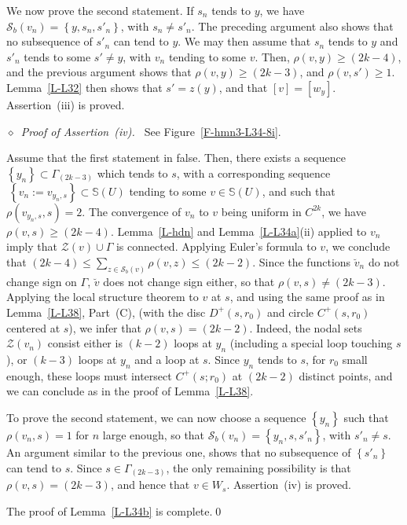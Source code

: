 \documentclass[12pt,a4paper]{amsart}
\theoremstyle{plain} %
\theoremstyle{definition}
\numberwithin{equation}{section}
\numberwithin{figure}{section}
\numberwithin{table}{section}
\newcommand{\bS}{\mathbb{S}}
\newcommand{\cS}{\mathcal{S}}
\newcommand{\cZ}{\mathcal{Z}}
\newcommand{\set}[1]{\left\lbrace #1 \right\rbrace}
\newcommand{\noi}{\noindent}
\newcommand{\noid}{\noindent $\diamond$~}
\begin{document}
We now prove the second statement. If $s_n$ tends to $y$, we have $\cS_b(v_n) = \set{y,s_n,s'_n}$, with $s_n \neq s'_n$. The preceding argument also shows that no subsequence of $s'_n$ can tend to $y$. We may then assume that $s_n$ tends to $y$ and $s'_n$ tends to some $s' \neq y$, with $v_n$ tending to some $v$. Then, $\rho(v,y) \ge (2k-4)$, and the previous argument shows that $\rho(v,y) \ge (2k-3)$, and $\rho(v,s') \ge 1$. Lemma~\ref{L-L32} then shows that $s' = z(y)$, and that $[v]=[w_y]$. Assertion~(iii) is proved. \medskip

\noid \emph{Proof of  Assertion~(iv).~} See Figure~\ref{F-hmn3-L34-8i}.\smallskip

\noi Assume that the first statement in false. Then, there exists a sequence $\set{y_n} \subset \Gamma_{(2k -3)}$ which tends to $s$, with a corresponding sequence $\ \set{v_n:=v_{y_n,s}} \subset \bS(U)$ tending to some $v \in \bS(U)$, and such that $\rho(v_{y_n,s},s) = 2$. The convergence of $v_n$ to $v$ being uniform in $C^{2k}$, we have $\rho(v,s) \ge (2k-4)$. Lemma~\ref{L-hdn} and Lemma~\ref{L-L34a}(ii) applied to $v_n$  imply that $ \cZ(v) \cup \Gamma $ is connected.  Applying Euler's formula to $v$, we conclude that $(2k-4) \le \sum_{z \in \cS_b(v)} \rho(v,z) \le (2k-2)$. Since the functions $\breve{v}_n$ do not change sign on $\Gamma $, $\breve{v}$ does not change sign either, so that $\rho(v,s) \neq (2k-3)$. Applying the local structure theorem to $v$ at $s$, and using the same proof as in Lemma~\ref{L-L38},  Part~(C),  (with the disc $D^{+}(s,r_0)$ and circle $C^{+}(s,r_0)$ centered at $s$), we infer that $\rho(v,s) = (2k-2)$.   Indeed, the nodal sets $\cZ(v_n)$ consist either is $(k-2)$ loops at $y_n$ (including a special loop touching $s$), or $(k-3)$ loops at $y_n$ and a loop at $s$. Since $y_n$ tends to $s$, for $r_0$ small enough, these loops must intersect $C^{+}(s;r_0)$ at $(2k-2)$ distinct points, and we can conclude as in the proof of Lemma~\ref{L-L38}.\smallskip

\noi To prove the second statement, we can now choose a sequence $\set{y_n}$ such that $\rho(v_n,s) = 1$ for $n$ large enough, so that $\cS_b(v_n) = \set{y_n,s,s'_n}$, with $s'_n \neq s$. An argument similar to the previous one, shows that no subsequence of $\set{s'_n}$ can tend to $s$. Since $s \in \Gamma_{(2k -3)}$, the only remaining possibility is that $\rho(v,s) = (2k-3)$, and hence that $v \in W_s$. Assertion~(iv) is proved. \medskip

The proof of Lemma~\ref{L-L34b} is complete.\hfill \qed \medskip
\end{document}
